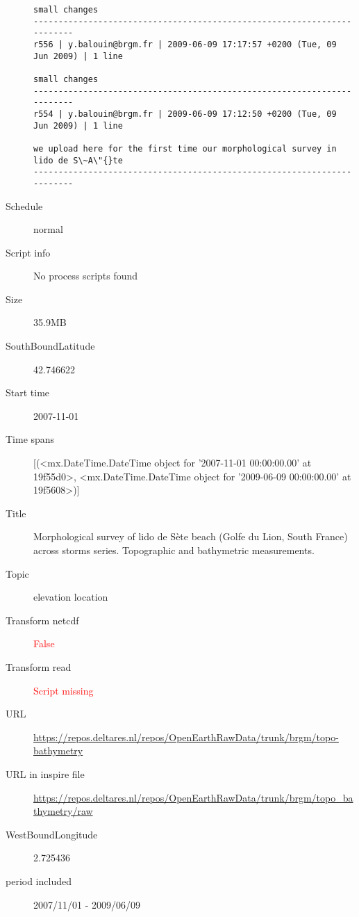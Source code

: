 \documentclass[9]{report}
\begin{document}
\begin{description}
\begin{verbatim}
small changes
------------------------------------------------------------------------
r556 | y.balouin@brgm.fr | 2009-06-09 17:17:57 +0200 (Tue, 09 Jun 2009) | 1 line

small changes
------------------------------------------------------------------------
r554 | y.balouin@brgm.fr | 2009-06-09 17:12:50 +0200 (Tue, 09 Jun 2009) | 1 line

we upload here for the first time our morphological survey in lido de S\~A\"{}te
------------------------------------------------------------------------

\end{verbatim}
  \item[Schedule] normal
  \item[Script info] No process scripts found
  \item[Size] 35.9MB
  \item[SouthBoundLatitude] 42.746622
  \item[Start time] 2007-11-01
  \item[Time spans] [(<mx.DateTime.DateTime object for '2007-11-01 00:00:00.00' at 19f55d0>, <mx.DateTime.DateTime object for '2009-06-09 00:00:00.00' at 19f5608>)]
  \item[Title]  Morphological survey of lido de S\`ete beach (Golfe du Lion, South France) across storms series. Topographic and bathymetric measurements. 
  \item[Topic] elevation location
  \item[Transform netcdf] \textcolor{red}{False}
  \item[Transform read] \textcolor{red}{Script missing}
  \item[URL] \href{https://repos.deltares.nl/repos/OpenEarthRawData/trunk/brgm/topo-bathymetry}{https://repos.deltares.nl/repos/OpenEarthRawData/trunk/brgm/topo-bathymetry}
  \item[URL in inspire file] \href{https://repos.deltares.nl/repos/OpenEarthRawData/trunk/brgm/topo\_bathymetry/raw}{https://repos.deltares.nl/repos/OpenEarthRawData/trunk/brgm/topo\_bathymetry/raw}
  \item[WestBoundLongitude] 2.725436
  \item[period included] 2007/11/01 - 2009/06/09
\end{description}
\end{document}
